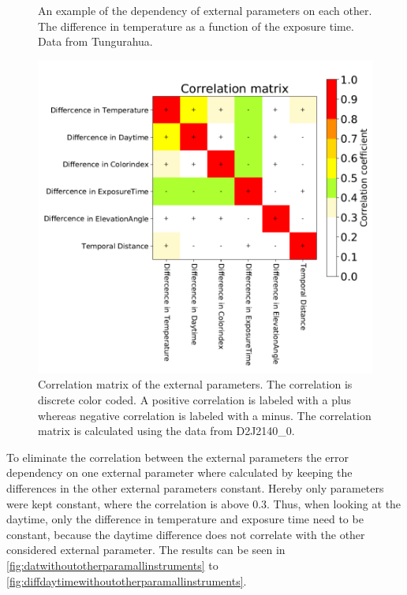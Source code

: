 \documentclass  [
  paper    = a4,
  BCOR     = 10mm,
  twoside,
  fontsize = 12pt,
  fleqn,
  toc      = bibnumbered,
  toc      = listofnumbered,
  numbers  = noendperiod,
  headings = normal,
  listof   = leveldown,
  version  = 3.03
]                                       {scrreprt}
\begin{document}
\begin{figure}[h!]
	\centering
	\caption{An example of the dependency of external parameters on each other. The difference in temperature as a function of the exposure time. Data from Tungurahua.}
	\label{fig:difference-in-exposure-time-msdifference-in-temperature-ctungu}
\end{figure}
\begin{figure}[h!]
	\centering
	\includegraphics[width=1\linewidth]{Bilder/varCorrelation_matrix}
	\caption[Correlation matrix of the external parameters using the data from D2J2140\_0.]{Correlation matrix of the external parameters. The correlation is discrete color coded. A positive correlation is labeled with a plus whereas negative correlation is labeled with a minus. The correlation matrix is calculated using the data from D2J2140\_0.}
	\label{fig:varcorrelationmatrix}
\end{figure}
%
To eliminate the correlation between the external parameters the   error dependency on one external parameter where calculated by keeping the differences in the other external parameters constant. Hereby only parameters were kept constant, where the correlation is above 0.3. Thus, when looking at the daytime, only the difference in temperature and exposure time need to be constant, because the daytime difference does not correlate with the other considered external parameter. The results can be seen in \cref{fig:datwithoutotherparamallinstruments} to \cref{fig:diffdaytimewithoutotherparamallinstruments}.\\
\end{document}
